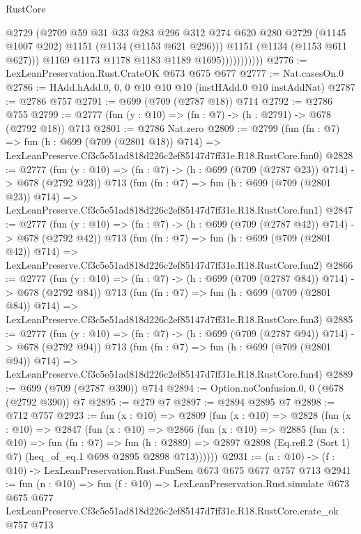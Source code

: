 \begin{lexlean}{RustCore}
\begin{coremodule}
                            @2729
                            (@2709
                              @59
                              @31
                              @33
                              @283
                              @296
                              @312
                              @274
                              @620
                              @280
                              @2729
                              (@1145 @1007 @202)
                              @1151
                              (@1134 (@1153 @621 @296)))
                            @1151
                            (@1134 (@1153 @611 @627)))
                          @1169
                          @1173
                          @1178
                          @1183
                          @1189
                          @1695)))))))))))
@2776 := LexLeanPreservation.Rust.CrateOK @673 @675 @677
@2777 := Nat.casesOn.{0}
@2786 := HAdd.hAdd.{0, 0, 0} @10 @10 @10 (instHAdd.{0} @10 instAddNat)
@2787 := @2786 @757
@2791 := @699 (@709 (@2787 @18)) @714
@2792 := @2786 @755
@2799 := @2777 (fun (y : @10) => (fn : @7) -> (h : @2791) -> @678 (@2792 @18)) @713
@2801 := @2786 Nat.zero
@2809 := @2799
    (fun (fn : @7) =>
    fun (h : @699 (@709 (@2801 @18)) @714) =>
    LexLeanPreserve.Cf3c5e51ad818d226c2ef85147d7ff31e.R18.RustCore.fun0)
@2828 := @2777
    (fun (y : @10) => (fn : @7) -> (h : @699 (@709 (@2787 @23)) @714) -> @678 (@2792 @23))
    @713
    (fun (fn : @7) =>
    fun (h : @699 (@709 (@2801 @23)) @714) =>
    LexLeanPreserve.Cf3c5e51ad818d226c2ef85147d7ff31e.R18.RustCore.fun1)
@2847 := @2777
    (fun (y : @10) => (fn : @7) -> (h : @699 (@709 (@2787 @42)) @714) -> @678 (@2792 @42))
    @713
    (fun (fn : @7) =>
    fun (h : @699 (@709 (@2801 @42)) @714) =>
    LexLeanPreserve.Cf3c5e51ad818d226c2ef85147d7ff31e.R18.RustCore.fun2)
@2866 := @2777
    (fun (y : @10) => (fn : @7) -> (h : @699 (@709 (@2787 @84)) @714) -> @678 (@2792 @84))
    @713
    (fun (fn : @7) =>
    fun (h : @699 (@709 (@2801 @84)) @714) =>
    LexLeanPreserve.Cf3c5e51ad818d226c2ef85147d7ff31e.R18.RustCore.fun3)
@2885 := @2777
    (fun (y : @10) => (fn : @7) -> (h : @699 (@709 (@2787 @94)) @714) -> @678 (@2792 @94))
    @713
    (fun (fn : @7) =>
    fun (h : @699 (@709 (@2801 @94)) @714) =>
    LexLeanPreserve.Cf3c5e51ad818d226c2ef85147d7ff31e.R18.RustCore.fun4)
@2889 := @699 (@709 (@2787 @390)) @714
@2894 := Option.noConfusion.{0, 0} (@678 (@2792 @390)) @7
@2895 := @279 @7
@2897 := @2894 @2895 @7
@2898 := @712 @757
@2923 := fun (x : @10) =>
  @2809
    (fun (x : @10) =>
    @2828
      (fun (x : @10) =>
      @2847
        (fun (x : @10) =>
        @2866
          (fun (x : @10) =>
          @2885
            (fun (x : @10) =>
            fun (fn : @7) =>
            fun (h : @2889) =>
            @2897 @2898 (Eq.refl.{2} (Sort 1) @7) (heq_of_eq.{1} @698 @2895 @2898 @713))))))
@2931 := (n : @10) -> (f : @10) -> LexLeanPreservation.Rust.FunSem @673 @675 @677 @757 @713
@2941 := fun (n : @10) =>
  fun (f : @10) =>
  LexLeanPreservation.Rust.simulate
    @673
    @675
    @677
    LexLeanPreserve.Cf3c5e51ad818d226c2ef85147d7ff31e.R18.RustCore.crate_ok
    @757
    @713
\end{coremodule}
\end{lexlean}
